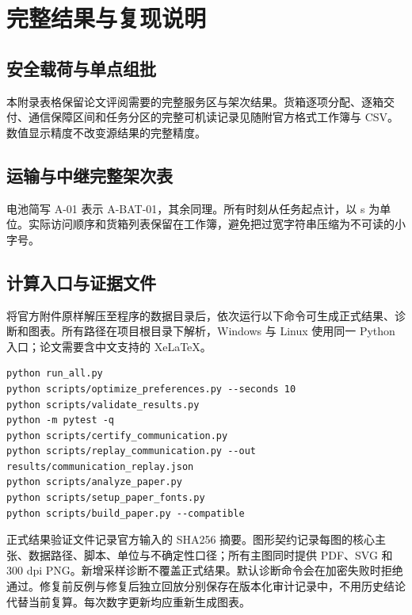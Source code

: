 \section{完整结果与复现说明}
\subsection{安全载荷与单点组批}
本附录表格保留论文评阅需要的完整服务区与架次结果。货箱逐项分配、逐箱交付、通信保障区间和任务分区的完整可机读记录见随附官方格式工作簿与 CSV。数值显示精度不改变源结果的完整精度。
\subsection{运输与中继完整架次表}
电池简写 A-01 表示 A-BAT-01，其余同理。所有时刻从任务起点计，以 s 为单位。实际访问顺序和货箱列表保留在工作簿，避免把过宽字符串压缩为不可读的小字号。
\subsection{计算入口与证据文件}
将官方附件原样解压至程序的数据目录后，依次运行以下命令可生成正式结果、诊断和图表。所有路径在项目根目录下解析，Windows 与 Linux 使用同一 Python 入口；论文需要含中文支持的 XeLaTeX。
\begingroup\small
\begin{verbatim}
python run_all.py
python scripts/optimize_preferences.py --seconds 10
python scripts/validate_results.py
python -m pytest -q
python scripts/certify_communication.py
python scripts/replay_communication.py --out results/communication_replay.json
python scripts/analyze_paper.py
python scripts/setup_paper_fonts.py
python scripts/build_paper.py --compatible
\end{verbatim}
\endgroup
正式结果验证文件记录官方输入的 SHA256 摘要。图形契约记录每图的核心主张、数据路径、脚本、单位与不确定性口径；所有主图同时提供 PDF、SVG 和 300 dpi PNG。新增采样诊断不覆盖正式结果。默认诊断命令会在加密失败时拒绝通过。修复前反例与修复后独立回放分别保存在版本化审计记录中，不用历史结论代替当前复算。每次数字更新均应重新生成图表。

